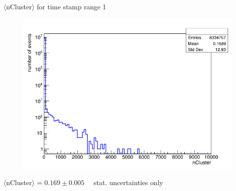 \documentclass{beamer}
\begin{document}
	\begin{frame}
		\begin{block}{$\langle$nCluster$\rangle$ for time stamp range 1}
			\begin{figure}[H!]
				\begin{center}
					\includegraphics[scale=0.25]{nCluster(1530412500<timeStamp<1530412800).png}
				\end{center}
			\end{figure}
		\begin{center}
				$\langle$nCluster$\rangle$ = $0.169 \pm 0.005 \quad$ stat. uncertainties only
		\end{center}
		\end{block}
	\end{frame}
\end{document}
